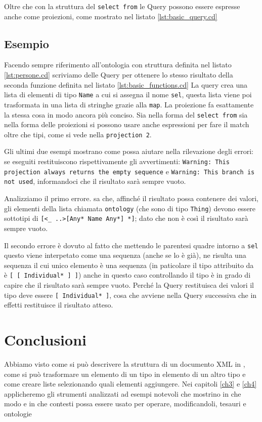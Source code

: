 Oltre che con la struttura del \verb|select from| le Query possono essere espresse anche come proiezioni, come mostrato nel listato \ref{lst:basic_query.cd}

\subsection{Esempio}
Facendo sempre riferimento all'ontologia con struttura definita nel listato \ref{lst:persone.cd} scriviamo delle Query per ottenere lo stesso risultato della seconda funzione definita nel listato \ref{lst:basic_functions.cd}
La query crea una lista di elementi di tipo \verb|Name| a cui si assegna il nome \verb|sel|, questa lista viene poi trasformata in una lista di stringhe grazie alla \verb|map|. La proiezione fa esattamente la stessa cosa in modo ancora più conciso. Sia nella forma del \verb|select from| sia nella forma delle proiezioni si possono usare anche espressioni per fare il match oltre che tipi, come si vede nella \verb|projection 2|.

Gli ultimi due esempi mostrano come \cduce possa aiutare nella rilevazione degli errori: se eseguiti restituiscono rispettivamente gli avvertimenti: \verb|Warning: This projection always returns the empty sequence| e \verb|Warning: This branch is not used|, informandoci che il risultato sarà sempre vuoto.

Analizziamo il primo errore. \cduce sa che, affinché il risultato possa contenere dei valori, gli elementi della lista chiamata \verb|ontology| (che sono di tipo \verb|Thing|) devono essere sottotipi di \verb|[<_ ..>[Any* Name Any*] *]|; dato che non è così il risultato sarà sempre vuoto.

Il secondo errore è dovuto al fatto che mettendo le parentesi quadre intorno a \verb|sel| questo viene interpetato come una sequenza (anche se lo è già), ne risulta una sequenza il cui unico elemento è una sequenza (in paticolare il tipo attribuito da \cduce è \verb|[ [ Individual* ] ]|) anche in questo caso controllando il tipo \cduce è in grado di capire che il risultato sarà sempre vuoto. Perché la Query restituisca dei valori il tipo deve essere \verb|[ Individual* ]|, cosa che avviene nella Query successiva che in effetti restituisce il risultato atteso.

\section*{Conclusioni}
Abbiamo visto come si può descrivere la struttura di un documento XML in \cduce, come si può trasformare un elemento di un tipo in elemento di un altro tipo e come creare liste selezionando quali elementi aggiungere. Nei capitoli \ref{ch3} e \ref{ch4} applicheremo gli strumenti analizzati ad esempi notevoli che mostrino in che modo e in che contesti \cduce possa essere usato per operare, modificandoli, tesauri e ontologie